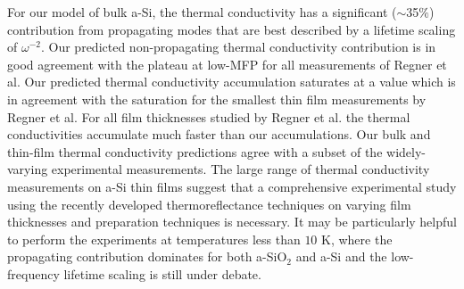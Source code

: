 For our model of bulk a-Si, 
the thermal conductivity has a significant ($\sim$35$\%$) 
contribution from propagating modes that are best 
described by a lifetime scaling of $\omega^{-2}$. Our predicted 
non-propagating thermal conductivity contribution is in good 
agreement with the plateau at low-MFP for all measurements of 
Regner et al. Our predicted 
thermal conductivity accumulation saturates at a value which 
is in agreement with the saturation for the smallest thin film 
measurements by Regner et al. For all film thicknesses 
studied by Regner et al. the thermal conductivities accumulate 
much faster than our accumulations. 
Our bulk and thin-film thermal conductivity predictions agree with 
a subset of the widely-varying experimental measurements. 
The large range of thermal conductivity measurements on 
a-Si thin films suggest that a comprehensive 
experimental study using the recently developed thermoreflectance 
techniques\cite{koh_frequency_2007,minnich_thermal_2011,
regner_broadband_2013,regner_instrumentation_2013} 
on varying film thicknesses and preparation techniques is necessary.  
It may be particularly helpful to perform the experiments 
at temperatures less than $10$ K, where the propagating contribution 
dominates for both a-SiO$_2$ and a-Si and the low-frequency 
lifetime scaling is still under debate.
\cite{freeman_thermal_1986,cahill_lattice_1988,
cahill_thermal_1989,love_estimate_1990,feldman_thermal_1993,
cahill_thermal_1994,feldman_numerical_1999,baldi_thermal_2008,
liu_high_2009,yang_anomalously_2010} 


